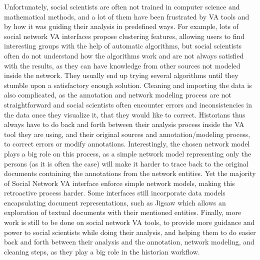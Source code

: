 Unfortunately, social scientists are often not trained in computer science and mathematical methods, and a lot of them have been frustrated by VA tools and by how it was guiding their analysis in predefined ways.
For example, lots of social network VA interfaces propose clustering features, allowing users to find interesting groups with the help of automatic algorithms, but social scientists often do not understand how the algorithms work and are not always satisfied with the results, as they can have knowledge from other sources not modeled inside the network.
They usually end up trying several algorithms until they stumble upon a satisfactory enough solution.
Cleaning and importing the data is also complicated, as the annotation and network modeling process are not straightforward and social scientists often encounter errors and inconsistencies in the data once they visualize it, that they would like to correct.
Historians thus always have to do back and forth between their analysis process inside the VA tool they are using, and their original sources and annotation/modeling process, to correct errors or modify annotations.
Interestingly, the chosen network model plays a big role on this process, as a simple network model representing only the persons (as it is often the case) will make it harder to trace back to the original documents containing the annotations from the network entities.
Yet the majority of Social Network VA interface enforce simple network models, making this retroactive process harder.
Some interfaces still incorporate data models encapsulating document representations, such as Jigsaw \cite{Stasko} which allows an exploration of textual documents with their mentioned entities.
Finally, more work is still to be done on social network VA tools, to provide more guidance and power to social scientists while doing their analysis, and helping them to do easier back and forth between their analysis and the annotation, network modeling, and cleaning steps, as they play a big role in the historian workflow.



